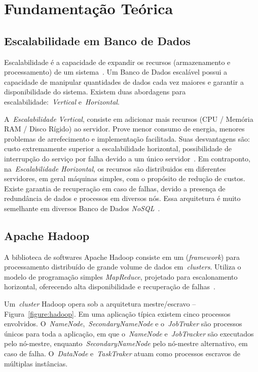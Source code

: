 \documentclass[12pt]{article}
\begin{document}
\section{Fundamentação Teórica}
\label{sec:fundamentacao}

\subsection{Escalabilidade em Banco de Dados}
\label{subsec:escalabilidade}

Escalabilidade é a capacidade de expandir os recursos (armazenamento e processamento) de um sistema~\cite{elmasri2010fundamentals}. Um Banco de Dados escalável possui a capacidade de manipular quantidades de dados cada vez maiores e garantir a disponibilidade do sistema. Existem duas abordagens para escalabilidade:~\emph{Vertical} e~\emph{Horizontal}.

A~\emph{Escalabilidade Vertical}, consiste em adicionar mais recursos (CPU / Memória RAM / Disco Rígido) ao servidor. Prove menor consumo de energia, menores problemas de arrefecimento e implementação facilitada. Suas desvantagens são: custo extremamente superior a escalabilidade horizontal, possibilidade de interrupção do serviço por falha devido a um único servidor~\cite{hwang2014scale}. Em contraponto, na~\emph{Escalabilidade Horizontal}, os recursos são distribuidos em diferentes servidores, em geral máquinas simples, com o propósito de redução de custos. Existe garantia de recuperação em caso de falhas, devido a presença de redundância de dados e processos em diversos nós. Essa arquitetura é muito semelhante em diversos Banco de Dados \textit{NoSQL}~\cite{hwang2014scale}.

\subsection{Apache Hadoop}
\label{subsection:hadoop}

A biblioteca de softwares Apache Hadoop consiste em um (\textit{framework}) para processamento distribuído de grande volume de dados em~\emph{clusters}. Utiliza o modelo de programação simples \emph{MapReduce}, projetado para escalonamento horizontal, oferecendo alta disponibilidade e recuperação de falhas~\cite{hadoophbase}.

Um~\emph{cluster} Hadoop opera sob a arquitetura mestre/escravo -- Figura~\ref{figure:hadoop}. Em uma aplicação típica existem cinco processos envolvidos. O~\emph{NameNode},~\emph{SecondaryNameNode} e o~\emph{JobTraker} são processos únicos para toda a aplicação, em que o~\emph{NameNode} e~\emph{JobTracker} são executados pelo nó-mestre, enquanto~\emph{SecondaryNameNode} pelo nó-mestre alternativo, em caso de falha. O~\emph{DataNode} e~\emph{TaskTraker} atuam como processos escravos de múltiplas instâncias. %
\end{document}
